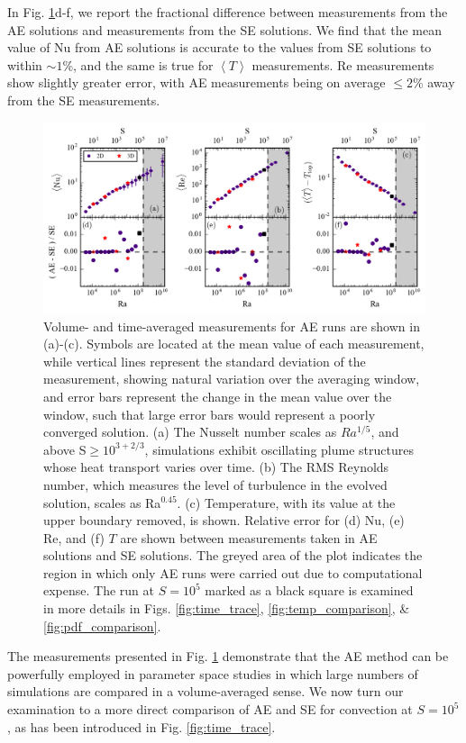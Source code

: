\documentclass[aps, pre, onecolumn, nofootinbib, notitlepage, groupedaddress, amsfonts, amssymb, amsmath, longbibliography]{revtex4-1}
\newcommand{\angles}[1]{\ensuremath{\left\langle #1 \right\rangle}}
\begin{document}
In Fig. \ref{fig:parameter_space_comparison}d-f, we report the fractional difference
between measurements from the AE solutions and measurements from the SE solutions.
We find that the mean value of Nu from AE solutions is accurate to the values
from SE solutions to within $\sim 1$\%, and the same is true for $\angles{T}$ measurements.
Re measurements show slightly greater error, with AE measurements being on average
$\leq 2$\% away from the SE measurements. 

\begin{figure}[t]
\includegraphics[width=\textwidth]{./figs/parameter_space_comparison.png}
\caption{Volume- and time-averaged measurements for AE runs are shown in (a)-(c).
Symbols are located at the mean value of
each measurement, while vertical lines represent the standard deviation of the measurement,
showing natural variation over the
averaging window, and error bars represent the change in the mean value over the window,
such that large error bars would represent a poorly converged solution.
(a) The Nusselt number scales as $Ra^{1/5}$, and above S$\geq 10^{3+2/3}$,
simulations exhibit oscillating plume structures whose heat transport varies over time.  
(b) The RMS Reynolds number, which measures the level of turbulence in the evolved solution, scales as
Ra$^{0.45}$. (c) Temperature, with its value at the upper boundary removed, is shown.
Relative error for (d) Nu, (e) Re, and (f) $T$ are shown between measurements 
taken in AE solutions and SE solutions.
The greyed area of the plot indicates the region in which only AE runs were
carried out due to computational expense. The run at $S = 10^5$ marked as a
black square is examined in more details in Figs. \ref{fig:time_trace},
\ref{fig:temp_comparison}, \& \ref{fig:pdf_comparison}.
\label{fig:parameter_space_comparison} }
\end{figure}

The measurements presented in Fig. \ref{fig:parameter_space_comparison} demonstrate
that the AE method can be powerfully employed in parameter space studies in which
large numbers of simulations are compared in a volume-averaged sense.  We now turn
our examination to a more direct comparison of AE and SE for convection at
$S = 10^5$, as has been introduced in Fig. \ref{fig:time_trace}.
\end{document}
